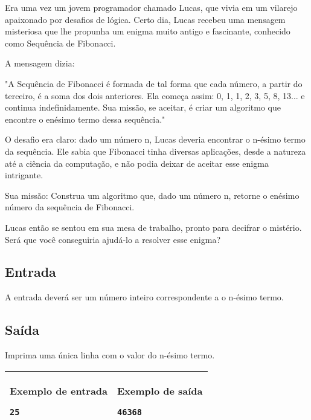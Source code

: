 Era uma vez um jovem programador chamado Lucas, que vivia em um vilarejo apaixonado por desafios de lógica. Certo dia, Lucas recebeu uma mensagem misteriosa que lhe propunha um enigma muito antigo e fascinante, conhecido como Sequência de Fibonacci.

A mensagem dizia:

"A Sequência de Fibonacci é formada de tal forma que cada número, a partir do terceiro, é a soma dos dois anteriores. Ela começa assim: 0, 1, 1, 2, 3, 5, 8, 13... e continua indefinidamente. Sua missão, se aceitar, é criar um algoritmo que encontre o enésimo termo dessa sequência."

O desafio era claro: dado um número n, Lucas deveria encontrar o n-ésimo termo da sequência. Ele sabia que Fibonacci tinha diversas aplicações, desde a natureza até a ciência da computação, e não podia deixar de aceitar esse enigma intrigante.

Sua missão: Construa um algoritmo que, dado um número n, retorne o enésimo número da sequência de Fibonacci.

Lucas então se sentou em sua mesa de trabalho, pronto para decifrar o mistério. Será que você conseguiria ajudá-lo a resolver esse enigma?

\subsection*{Entrada}

A entrada deverá ser um número inteiro correspondente a o n-ésimo termo.

\subsection*{Saída}

Imprima uma única linha com o valor do n-ésimo termo.

\begin{table}[!h]
\centering
\begin{tabular}{|l|l|}
\hline
\begin{minipage}[t]{3in}
\textbf{Exemplo de entrada}
\begin{verbatim}
25
\end{verbatim}
\vspace{1mm}
\end{minipage}
&
\begin{minipage}[t]{3in}
\textbf{Exemplo de saída}
\begin{verbatim}
46368
\end{verbatim}
\vspace{1mm}
\end{minipage} \\
\hline
\end{tabular}
\end{table}

